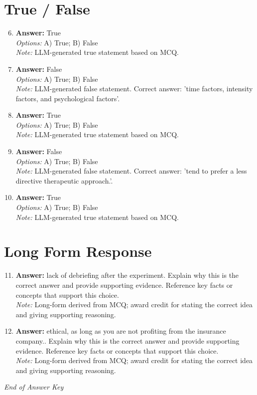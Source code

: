 \documentclass[12pt]{article}
\begin{document}
\section*{True / False}
\begin{enumerate}[label=\arabic*.]
\setcounter{enumi}{5}
\item \textbf{Answer:} True
\\ \textit{Options:} A) True; B) False
\\ \textit{Note:} LLM-generated true statement based on MCQ.
\item \textbf{Answer:} False
\\ \textit{Options:} A) True; B) False
\\ \textit{Note:} LLM-generated false statement. Correct answer: 'time factors, intensity factors, and psychological factors'.
\item \textbf{Answer:} True
\\ \textit{Options:} A) True; B) False
\\ \textit{Note:} LLM-generated true statement based on MCQ.
\item \textbf{Answer:} False
\\ \textit{Options:} A) True; B) False
\\ \textit{Note:} LLM-generated false statement. Correct answer: 'tend to prefer a less directive therapeutic approach.'.
\item \textbf{Answer:} True
\\ \textit{Options:} A) True; B) False
\\ \textit{Note:} LLM-generated true statement based on MCQ.
\end{enumerate}

\section*{Long Form Response}
\begin{enumerate}[label=\arabic*.]
\setcounter{enumi}{10}
\item \textbf{Answer:} lack of debriefing after the experiment. Explain why this is the correct answer and provide supporting evidence. Reference key facts or concepts that support this choice.
\\ \textit{Note:} Long-form derived from MCQ; award credit for stating the correct idea and giving supporting reasoning.
\item \textbf{Answer:} ethical, as long as you are not profiting from the insurance company.. Explain why this is the correct answer and provide supporting evidence. Reference key facts or concepts that support this choice.
\\ \textit{Note:} Long-form derived from MCQ; award credit for stating the correct idea and giving supporting reasoning.
\end{enumerate}

\vfill
\noindent\textit{End of Answer Key}
\end{document}
